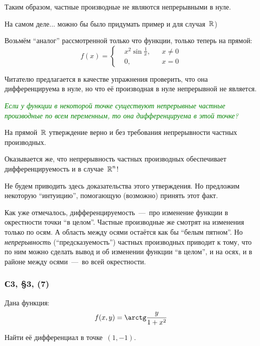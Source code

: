 \documentclass[a4paper,12pt]{article}
\begin{document}
\begin{solution}
    Таким образом, частные производные не являются непрерывными в нуле.

    На самом деле... можно бы было придумать пример и для случая~$\operatorname{\mathbb R}$)

    Возьмём ``аналог'' рассмотренной только что функции, только теперь на прямой:
    \[
      f(x) = \left\{
        \begin{aligned}
          &x^2 \sin\frac{1}{x}, & &x \not= 0\\
          &0, & &x = 0
        \end{aligned}
      \right.
    \]

    Читателю предлагается в качестве упражнения проверить, что она дифференцируема в нуле, но что её производная в нуле непрерывной не является.

    \medskip
    
    \textcolor{green}{\emph{
      Если у функции в некоторой точке существуют \emph{непрерывные} частные производные по всем переменным, то она дифференцируема в этой точке?
    }}

    На прямой~$\operatorname{\mathbb R}$ утверждение верно и без требования непрерывности частных производных.

    Оказывается же, что непрерывность частных производных обеспечивает дифференцируемость и в случае~$\operatorname{\mathbb R}^n$!

    Не будем приводить здесь доказательства этого утверждения.  %
    Но предложим некоторую ``интуицию'', помогающую (возможно) принять этот факт.

    Как уже отмечалось, дифференцируемость~---~про изменение функции в окрестности точки ``в целом''.
    Частные производные же смотрят на изменения только по осям.
    А область между осями остаётся как бы ``белым пятном''.
    Но \emph{непрерывность} (``предсказуемость'') частных производных приводит к тому, что по ним можно сделать вывод и об изменении функции ``в целом'', и на осях, и в районе между осями~---~во всей окрестности.

  \end{solution}

  \subsubsection{С3, \S 3, (7)}\label{sec:s3-par3-15(7)}

  Дана функция:
  \[
    f(x, y) = \arctg \frac{y}{1 + x^2}
  \]

  Найти её дифференциал в точке~$(1, -1)$.
  
\end{document}
